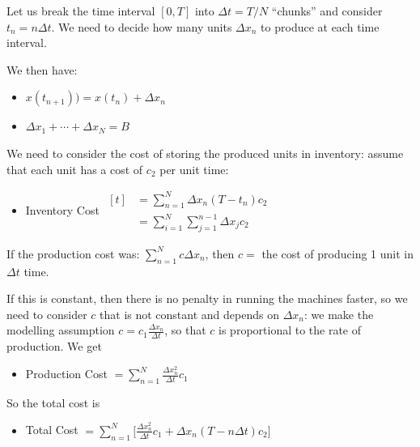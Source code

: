 \begin{solution}
\begin{slide}

\begin{parts}

\item Let us break the time interval $[0,T]$ into $\Delta t = T/N$ ``chunks'' and consider $t_n=n \Delta t$. We need to decide how many units $\Delta x_n$ to produce at each time interval.

\item We then have:
\begin{itemize}
	\item $x(t_{n+1})) = x(t_n) + \Delta x_n$
	\item $\Delta x_1 + \cdots + \Delta x_N = B$
\end{itemize}

\item We need to consider the cost of storing the produced units in inventory: assume that each unit has a cost of $c_2$ per unit time:
\begin{itemize}
	\item Inventory Cost $\displaystyle \begin{aligned}[t]
			& = \sum_{n=1}^N \Delta x_n (T-t_n) c_2 \\
			& = \sum_{i=1}^N \sum_{j=1}^{n-1} \Delta x_j c_2
		\end{aligned}
		$
	
\end{itemize}

\item If the production cost was: $\displaystyle\sum_{n=1}^N c \Delta x_n$, then $c=$ the cost of producing 1 unit in $\Delta t$ time.

If this is constant, then there is no penalty in running the machines faster, so we need to consider $c$ that is not constant and depends on $\Delta x_n$: we make the modelling assumption $c = c_1 \frac{\Delta x_n}{\Delta t}$, so that $c$ is proportional to the rate of production.
We get
\begin{itemize}
	\item Production Cost $\displaystyle = \sum_{n=1}^N  \frac{\Delta x_n^2}{\Delta t} c_1	$
\end{itemize}

\item So the total cost is
\begin{itemize}
	\item Total Cost $\displaystyle = \sum_{n=1}^N \bigg[ \frac{\Delta x_n^2}{\Delta t} c_1 + \Delta x_n (T- n \Delta t ) c_2 \bigg]$
\end{itemize}


\end{parts}
\end{slide}
\end{solution}
